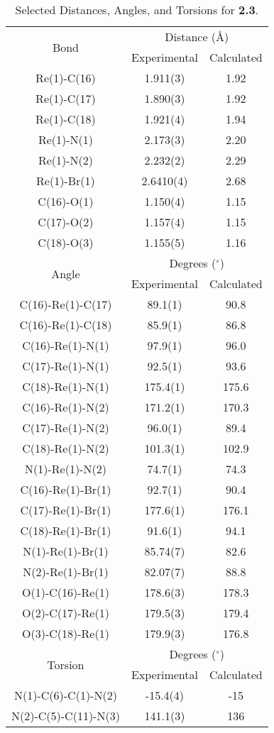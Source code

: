 \begin{table}[htbp]
  \caption{Selected Distances, Angles, and Torsions for \textbf{2.3}.}
  \centering
    \begin{tabular}{ccc}
    \toprule
   \multirow{2}{*}{Bond} & \multicolumn{2}{c}{Distance (\r{A})} \\ \cline{2-3}
     & Experimental & Calculated \\ \midrule
    Re(1)-C(16) & 1.911(3) & 1.92 \\
    Re(1)-C(17) & 1.890(3) & 1.92 \\
    Re(1)-C(18) & 1.921(4) & 1.94 \\
    Re(1)-N(1) & 2.173(3) & 2.20 \\
    Re(1)-N(2) & 2.232(2) & 2.29 \\
    Re(1)-Br(1) & 2.6410(4) & 2.68 \\ 
    C(16)-O(1) & 1.150(4) & 1.15 \\
    C(17)-O(2) & 1.157(4) & 1.15 \\
    C(18)-O(3) & 1.155(5) & 1.16 \\ \midrule
    \multirow{2}{*}{Angle} & \multicolumn{2}{c}{Degrees ($^\circ$)} \\ \cline{2-3}
     & Experimental & Calculated \\ \midrule
    C(16)-Re(1)-C(17) & 89.1(1) & 90.8 \\
    C(16)-Re(1)-C(18) & 85.9(1) & 86.8 \\
    C(16)-Re(1)-N(1) & 97.9(1) & 96.0 \\
    C(17)-Re(1)-N(1) & 92.5(1) & 93.6 \\
    C(18)-Re(1)-N(1) & 175.4(1) & 175.6 \\
    C(16)-Re(1)-N(2) & 171.2(1) & 170.3 \\
    C(17)-Re(1)-N(2) & 96.0(1) & 89.4 \\
    C(18)-Re(1)-N(2) & 101.3(1) & 102.9 \\
    N(1)-Re(1)-N(2) & 74.7(1) & 74.3 \\
    C(16)-Re(1)-Br(1) & 92.7(1) & 90.4 \\
    C(17)-Re(1)-Br(1) & 177.6(1) & 176.1 \\
    C(18)-Re(1)-Br(1) & 91.6(1) & 94.1 \\
    N(1)-Re(1)-Br(1) & 85.74(7) & 82.6 \\
    N(2)-Re(1)-Br(1) & 82.07(7) & 88.8 \\
    O(1)-C(16)-Re(1) & 178.6(3) & 178.3 \\
    O(2)-C(17)-Re(1) & 179.5(3) & 179.4 \\
    O(3)-C(18)-Re(1) & 179.9(3) & 176.8 \\\midrule
    \multirow{2}{*}{Torsion} & \multicolumn{2}{c}{Degrees ($^\circ$)} \\ \cline{2-3}
     & Experimental & Calculated \\ \midrule
    N(1)-C(6)-C(1)-N(2) & -15.4(4) & -15 \\
    N(2)-C(5)-C(11)-N(3) & 141.1(3) & 136 \\
    \bottomrule
    \end{tabular}%
  \label{tab.da3}%
\end{table}%


